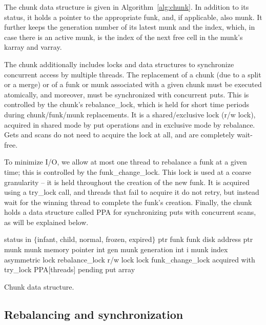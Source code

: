 The chunk data structure is given in Algorithm~\ref{alg:chunk}. 
In addition to its status, 
it holds a pointer to the appropriate funk, and, if applicable, also munk. 
It further keeps the generation number of its latest munk and the index,
which, in case there is an active munk, is the index of the next free cell in the munk's karray and varray.

The chunk additionally includes locks and data structures to synchronize concurrent access by multiple threads.
The replacement of a chunk (due to a split or a merge) or of a funk or munk associated with a given chunk 
must be executed atomically, and moreover, must be synchronized with concurrent puts. 
This is controlled by the chunk's rebalance\_lock, which is held for short time periods
during chunk/funk/munk replacements.  It is a shared/exclusive lock (r/w lock), acquired in shared mode 
by put operations and in exclusive mode by rebalance. Gets and scans do not need to acquire the lock at all,
and are completely wait-free.

To minimize I/O, we allow at most one thread to rebalance a funk at a given time; this is controlled by 
the  funk\_change\_lock. This lock is used at a coarse granularity -- it is held throughout the creation of the new funk. 
It is acquired using a try\_lock call, and threads that fail to acquire it do not retry, but instead wait for the winning thread 
to complete the funk's creation.
Finally, the chunk holds a data structure called PPA for synchronizing  puts with concurrent scans, as will be explained below. 

\begin{algorithm}[htb]
\begin{algorithmic}
\State status in $\{$infant, child, normal, frozen, expired$\}$
\State ptr funk \Comment funk disk address
\State ptr munk \Comment munk memory pointer
\State int gen \Comment munk generation
\State int i \Comment munk index
\State asymmetric lock rebalance\_lock \Comment r/w lock 
\State lock funk\_change\_lock \Comment acquired with try\_lock 
\State PPA[threads] \Comment pending put array
\end{algorithmic}
\caption{Chunk data structure.}
\label{alg:chunk}
\end{algorithm}



\subsection{Rebalancing and synchronization}
\label{ssec:sync}





